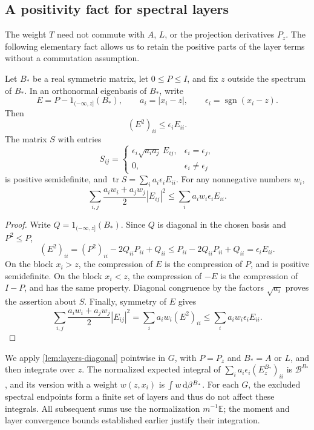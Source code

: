 \subsection{A positivity fact for spectral layers}

The weight $T$ need not commute with $A$, $L$, or the projection derivatives $P_z$.  The following elementary fact allows us to retain the positive parts of the layer terms without a commutation assumption.

\begin{lemma}
\label{lem:layers-diagonal}
Let $B_*$ be a real symmetric matrix, let $0\le P\le I$, and fix $z$ outside the spectrum of $B_*$. In an orthonormal eigenbasis of $B_*$, write
\[
 E=P-1_{(-\infty,z]}(B_*),\qquad
 a_i=|x_i-z|,\qquad \epsilon_i=\operatorname{sgn}(x_i-z).
\]
Then
\[
 (E^2)_{ii}\le\epsilon_iE_{ii}.
\]
The matrix $S$ with entries
\[
 S_{ij}=
 \begin{cases}
  \epsilon_i\sqrt{a_i a_j}\,E_{ij},&\epsilon_i=\epsilon_j,\\
  0,&\epsilon_i\ne\epsilon_j
 \end{cases}
\]
is positive semidefinite, and $\operatorname{tr}S=\sum_i a_i\epsilon_iE_{ii}$. For any nonnegative numbers $w_i$,
\[
 \sum_{i,j}\frac{a_iw_i+a_jw_j}{2}|E_{ij}|^2
 \le\sum_i a_iw_i\epsilon_iE_{ii}.
\]
\end{lemma}

\begin{proof}
Write $Q=1_{(-\infty,z]}(B_*)$. Since $Q$ is diagonal in the chosen basis and $P^2\le P$,
\[
 (E^2)_{ii}=(P^2)_{ii}-2Q_{ii}P_{ii}+Q_{ii}
 \le P_{ii}-2Q_{ii}P_{ii}+Q_{ii}
 =\epsilon_iE_{ii}.
\]
On the block $x_i>z$, the compression of $E$ is the compression of $P$, and is positive semidefinite. On the block $x_i<z$, the compression of $-E$ is the compression of $I-P$, and has the same property. Diagonal congruence by the factors $\sqrt{a_i}$ proves the assertion about $S$. Finally, symmetry of $E$ gives
\[
 \sum_{i,j}\frac{a_iw_i+a_jw_j}{2}|E_{ij}|^2
 =\sum_i a_iw_i(E^2)_{ii}
 \le\sum_i a_iw_i\epsilon_iE_{ii}.
\]
\end{proof}

We apply \cref{lem:layers-diagonal} pointwise in $G$, with $P=P_z$ and $B_*=A$ or $L$, and then integrate over $z$. The normalized expected integral of $\sum_i a_i\epsilon_i(E_z^{B_*})_{ii}$ is $\mathcal{B}^{B_*}$, and its version with a weight $w(z,x_i)$ is $\int w\,\mathrm{d} \beta^{B_*}$. For each $G$, the excluded spectral endpoints form a finite set of layers and thus do not affect these integrals. All subsequent sums use the normalization $m^{-1}\mathbb{E}$; the moment and layer convergence bounds established earlier justify their integration.

